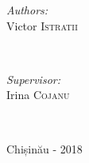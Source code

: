 \begin{titlepage}
\begin{center}
      \vspace{20mm}

      \begin{minipage}{0.4\textwidth}
      \begin{flushleft} \large
      \emph{Authors:}\\
      Victor \textsc{Istratii}
      \end{flushleft}
      \end{minipage}
      ~
      \begin{minipage}{0.4\textwidth}
      \begin{flushright} \large
      \emph{Supervisor:} \\
      Irina \textsc{Cojanu} %
      \end{flushright}
      \end{minipage}\\[4cm]

      \vspace{5 mm}
      
      \large Chișinău - 2018






      \vfill %
      \end{center}
      
\end{titlepage}
